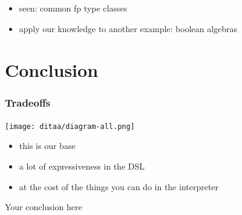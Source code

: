 \documentclass{beamer}
\begin{document}
\begin{frame}
  \begin{itemize}
  \item seen: common fp type classes
  \item apply our knowledge to another example: boolean algebras
  \end{itemize}
\end{frame}

\section{Conclusion}\label{sec:conclusion}

\begin{frame}
  \frametitle{Tradeoffs}
  \texttt{[image: ditaa/diagram-all.png]}
  \begin{itemize}
  \item this is our base
  \item a lot of expressiveness in the DSL
  \item at the cost of the things you can do in the interpreter
  \end{itemize}
\end{frame}

\begin{frame}
  \begin{center}
    \huge
    Your conclusion here
  \end{center}
\end{frame}
\end{document}
